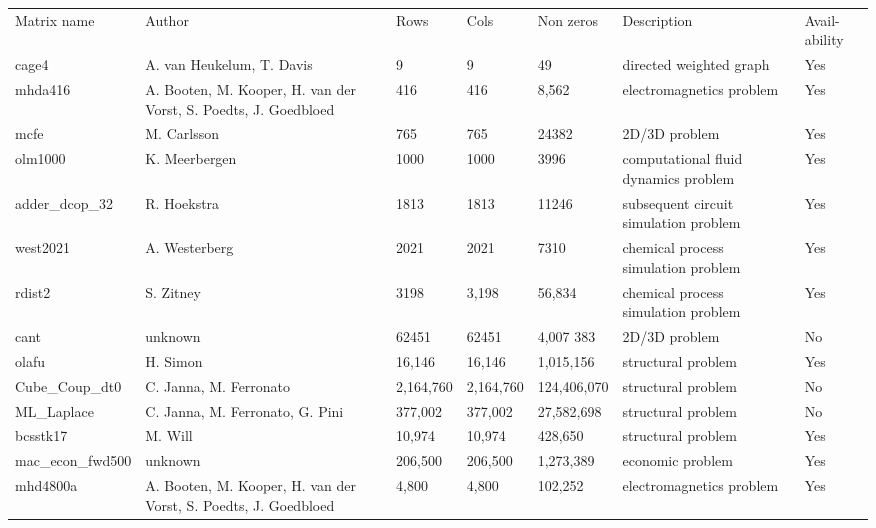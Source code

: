 \documentclass{scrreprt}
\begin{document}
\begin{longtable}[h!]{ |s|p{2cm}|p{0.4cm}|p{0.4cm}|p{0.5cm}|p{2cm}|p{0.6cm}|  }
\hline
{}  \\
\hline
Matrix name & Author &Rows &Cols &Non zeros & Description & Avail-ability \\
\hline
cage4 & A. van Heukelum, T. Davis &9 & 9 &49 & directed weighted graph &  Yes   \\

mhda416 & A. Booten, M. Kooper, H. van der Vorst, S. Poedts, J. Goedbloed &416 & 416 &8,562 & electromagnetics problem &  Yes   \\
mcfe & 	M. Carlsson &765 & 765 &24382 & 2D/3D problem &  Yes   \\
olm1000 & 	K. Meerbergen &1000 & 1000 &3996 & computational fluid dynamics problem &  Yes   \\
adder_dcop_32 & 	R. Hoekstra &1813 & 1813 &11246 & subsequent circuit simulation problem &  Yes   \\
west2021 & A. Westerberg &2021 & 2021 &7310 & chemical process simulation problem &  Yes   \\
rdist2 & 	S. Zitney &3198 & 3,198 &56,834& chemical process simulation problem &  Yes   \\
cant & unknown &62451& 62451 &4,007 383 & 2D/3D problem &  No   \\
olafu & 	H. Simon &16,146 & 16,146 &1,015,156 & 	structural problem &  Yes   \\
Cube_Coup_dt0 & C. Janna, M. Ferronato &2,164,760 & 2,164,760 &124,406,070 & structural problem & No   \\
ML_Laplace & C. Janna, M. Ferronato, G. Pini &377,002 & 377,002 &27,582,698 & structural problem &  No   \\
bcsstk17 & M. Will &10,974 & 10,974 &428,650 & structural problem &  Yes   \\
mac_econ_fwd500 & 	unknown &206,500& 206,500 &1,273,389 & 	economic problem & Yes   \\
mhd4800a & 	A. Booten, M. Kooper, H. van der Vorst, S. Poedts, J. Goedbloed &4,800 & 4,800 &102,252 & electromagnetics problem &  Yes   \\

\end{longtable}
\end{document}
